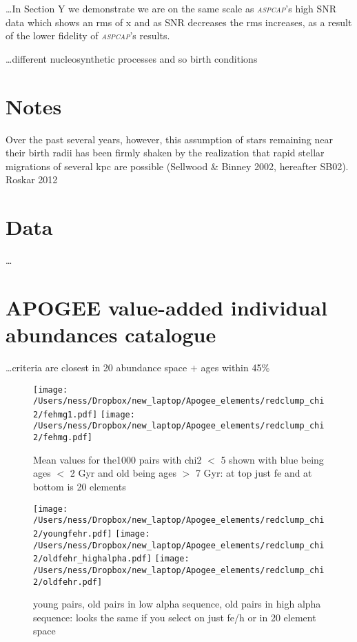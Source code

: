 \documentclass[12pt, preprint]{aastex}
\newcommand{\project}[1]{\textsl{#1}}
\newcommand{\aspcap}{\project{\textsc{aspcap}}}
\begin{document}
 \ldots In Section Y we demonstrate we are on the same scale as \aspcap's high SNR data which shows an rms of x and as SNR decreases the rms increases, as a result of the lower fidelity of \aspcap's results. 


\ldots different nucleosynthetic processes and so birth conditions \\ 

\section{Notes} 
Over the past several years, however, this assumption of
stars remaining near their birth radii has been firmly shaken by the
realization that rapid stellar migrations of several kpc are possible
(Sellwood \& Binney 2002, hereafter SB02). Roskar 2012



\section{Data}

\ldots 


\section{APOGEE value-added individual abundances catalogue}
\ldots criteria are closest in 20 abundance space $+$ ages within 45\%

\begin{figure}
\centering
\flushleft
  \texttt{[image: /Users/ness/Dropbox/new\_laptop/Apogee\_elements/redclump\_chi2/fehmg1.pdf]}
  \texttt{[image: /Users/ness/Dropbox/new\_laptop/Apogee\_elements/redclump\_chi2/fehmg.pdf]}
    \caption{ Mean values for the1000 pairs with chi2 $<$ 5 shown with blue being ages $<$ 2 Gyr and old being ages $>$ 7 Gyr: at top just fe and at bottom is 20 elements}
\label{fig:cn}
\end{figure}

\begin{figure}
\centering
\flushleft
  \texttt{[image: /Users/ness/Dropbox/new\_laptop/Apogee\_elements/redclump\_chi2/youngfehr.pdf]}
    \texttt{[image: /Users/ness/Dropbox/new\_laptop/Apogee\_elements/redclump\_chi2/oldfehr\_highalpha.pdf]} %
        \texttt{[image: /Users/ness/Dropbox/new\_laptop/Apogee\_elements/redclump\_chi2/oldfehr.pdf]}
    \caption{ young pairs, old pairs in low alpha sequence, old pairs in high alpha sequence: looks the same if you select on just fe/h or in 20 element space }
\label{fig:cn}
\end{figure}
\end{document}
